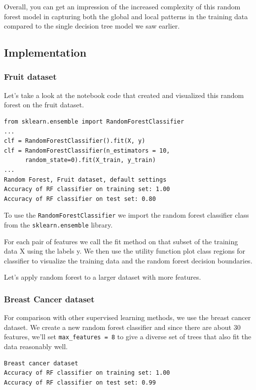 Overall, you can get an impression of the increased complexity of this random forest model in capturing both the global and local patterns in the training data compared to the single decision tree model we saw earlier. 

\subsection{Implementation}

\subsubsection*{Fruit dataset}

Let's take a look at the notebook code that created and visualized this random forest on the fruit dataset.
{\scriptsize
\begin{verbatim}
from sklearn.ensemble import RandomForestClassifier
...
clf = RandomForestClassifier().fit(X, y)
clf = RandomForestClassifier(n_estimators = 10,
      random_state=0).fit(X_train, y_train)
...
Random Forest, Fruit dataset, default settings
Accuracy of RF classifier on training set: 1.00
Accuracy of RF classifier on test set: 0.80
\end{verbatim}
}

To use the \texttt{RandomForestClassifier} we import the random forest classifier class from the \texttt{sklearn.ensemble} library. 

For each pair of features we call the fit method on that subset of the training data X using the labels y. We then use the utility function plot class regions for classifier to visualize the training data and the random forest decision boundaries. 

Let's apply random forest to a larger dataset with more features. 

\subsubsection*{Breast Cancer dataset}

For comparison with other supervised learning methods, we use the breast cancer dataset. We create a new random forest classifier and since there are about 30 features, we'll set \texttt{max_features~=~8} to give a diverse set of trees that also fit the data reasonably well. 

{\scriptsize
\begin{verbatim}
Breast cancer dataset
Accuracy of RF classifier on training set: 1.00
Accuracy of RF classifier on test set: 0.99
\end{verbatim}
}

